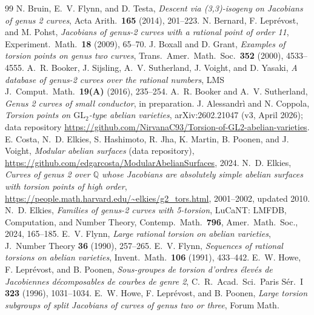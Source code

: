 \documentclass[11pt]{amsart}
\begin{document}
\begin{thebibliography}{99}
 N. Bruin, E.~V. Flynn, and D. Testa, \emph{Descent via (3,3)-isogeny
on Jacobians of genus 2 curves}, Acta Arith.\ \textbf{165} (2014), 201--223.
 N. Bernard, F. Lepr\'evost, and M. Pohst, \emph{Jacobians of
genus-2 curves with a rational point of order 11}, Experiment.\ Math.\ \textbf{18}
(2009), 65--70.
 J. Boxall and D. Grant, \emph{Examples of torsion
points on genus two curves}, Trans.\ Amer.\ Math.\ Soc.\ \textbf{352} (2000),
4533--4555.
 A.~R. Booker, J. Sijsling, A.~V. Sutherland, J. Voight, and D. Yasaki,
\emph{A database of genus-2 curves over the rational numbers},
LMS J.~Comput.\ Math.\ \textbf{19(A)} (2016), 235--254.
 A.~R. Booker and A.~V. Sutherland,
\emph{Genus 2 curves of small conductor}, in preparation.
 J. Alessandr\`i and N. Coppola, \emph{Torsion points on
$\mathrm{GL}_2$-type abelian varieties}, arXiv:2602.21047 (v3, April 2026);
data repository \url{https://github.com/NirvanaC93/Torsion-of-GL2-abelian-varieties}.
 E. Costa, N.~D. Elkies, S. Hashimoto, R. Jha, K. Martin,
B. Poonen, and J. Voight, \emph{Modular abelian surfaces} (data repository),
\url{https://github.com/edgarcosta/ModularAbelianSurfaces}, 2024.
 N.~D. Elkies, \emph{Curves of genus 2 over $\mathbb{Q}$ whose
Jacobians are absolutely simple abelian surfaces with torsion points of high order},
\url{https://people.math.harvard.edu/~elkies/g2_tors.html}, 2001--2002, updated 2010.
 N.~D. Elkies, \emph{Families of genus-2 curves with 5-torsion},
LuCaNT: LMFDB, Computation, and Number Theory, Contemp.\ Math.\ \textbf{796},
Amer.\ Math.\ Soc., 2024, 165--185.
 E.~V. Flynn, \emph{Large rational torsion on abelian varieties},
J.~Number Theory \textbf{36} (1990), 257--265.
 E.~V. Flynn, \emph{Sequences of rational torsions on abelian
varieties}, Invent.\ Math.\ \textbf{106} (1991), 433--442.
 E.~W. Howe, F. Lepr\'evost, and B. Poonen, \emph{Sous-groupes de
torsion d'ordres \'elev\'es de Jacobiennes d\'ecomposables de courbes de genre 2},
C.~R.\ Acad.\ Sci.\ Paris S\'er.\ I \textbf{323} (1996), 1031--1034.
 E.~W. Howe, F. Lepr\'evost, and B. Poonen, \emph{Large torsion
subgroups of split Jacobians of curves of genus two or three}, Forum Math.\

\end{thebibliography}
\end{document}

